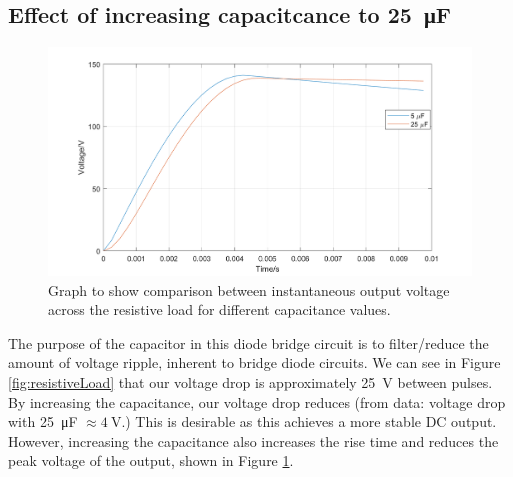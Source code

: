 \subsection{Effect of increasing capacitcance to \SI{25}{\micro\farad}}
\begin{figure}[H]
    \centering
    \includegraphics[width = \textwidth]{img/figure4.png}
    \caption{Graph to show comparison between instantaneous output voltage across the resistive load for different capacitance values.}
    \label{fig:comp1}
\end{figure}
The purpose of the capacitor in this diode bridge circuit is to filter/reduce the amount of voltage ripple, inherent to bridge diode circuits. We can see in Figure \ref{fig:resistiveLoad} that our voltage drop is approximately \SI{25}{\volt} between pulses. By increasing the capacitance, our voltage drop reduces (from data: voltage drop with \SI{25}{\micro\farad} $\approx \SI{4}{\volt}$.) This is desirable as this achieves a more stable DC output. However, increasing the capacitance also increases the rise time and reduces the peak voltage of the output, shown in Figure \ref{fig:comp1}.